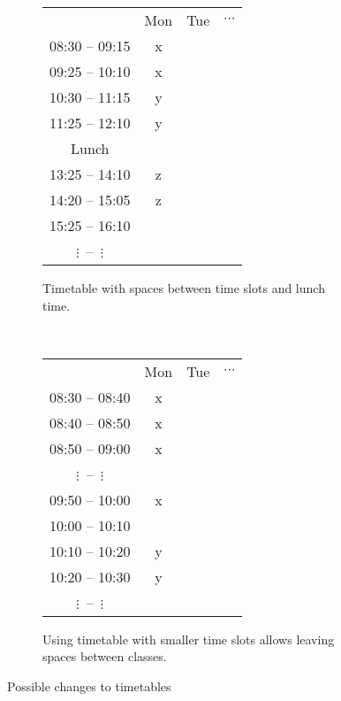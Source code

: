 \documentclass[header]{subfiles}
\begin{document}
\begin{figure}[h]
  \begin{subfigure}[b]{.5\textwidth}
    \centering
    \begin{tabular}{|c||c|c|c|}
      \hline & Mon & Tue & $\cdots$ \\
      \hhline{|=#=|=|=|}
      08:30 -- 09:15 & x & & \\\hline
      09:25 -- 10:10 & x & & \\\hline
      10:30 -- 11:15 & y & & \\\hline
      11:25 -- 12:10 & y & & \\\hline
      Lunch          &   & & \\\hline
      13:25 -- 14:10 & z & & \\\hline
      14:20 -- 15:05 & z & & \\\hline
      15:25 -- 16:10 &   & & \\\hline
      $\vdots$\quad~--~\quad$\vdots$ & & & \\\hline
    \end{tabular}
    \caption{Timetable with spaces between time slots and lunch time.}
    \label{fig:timetable-intervals-predef}
  \end{subfigure}
  ~
  \begin{subfigure}[b]{.5\textwidth}
    \centering
    \begin{tabular}{|c||c|c|c|}
      \hline & Mon & Tue & $\cdots$ \\
      \hhline{|=#=|=|=|}
      08:30 -- 08:40 & x & & \\\hline
      08:40 -- 08:50 & x & & \\\hline
      08:50 -- 09:00 & x & & \\\hline
      $\vdots$\quad~--~\quad$\vdots$ & & & \\\hline
      09:50 -- 10:00 & x & & \\\hline
      10:00 -- 10:10 &   & & \\\hline
      10:10 -- 10:20 & y & & \\\hline
      10:20 -- 10:30 & y & & \\\hline
      $\vdots$\quad~--~\quad$\vdots$ & & & \\\hline
    \end{tabular}
    \caption{Using timetable with smaller time slots allows leaving spaces
             between classes.}
    \label{fig:timetable-intervals-any}
  \end{subfigure}
  \caption{Possible changes to timetables}
\end{figure}
\end{document}
